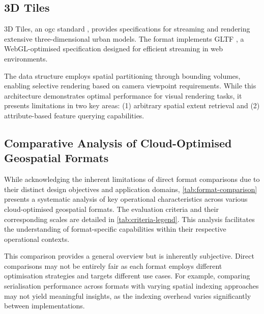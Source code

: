 \subsection{3D Tiles}
\label{rw:cloud_optimised_implementations:3d_tiles}
3D Tiles, an \ac{ogc} standard \citep{3d_tiles}, provides specifications for streaming and rendering extensive three-dimensional urban models. The format implements GLTF \citep{gltf}, a WebGL-optimised specification designed for efficient streaming in web environments.

The data structure employs spatial partitioning through bounding volumes, enabling selective rendering based on camera viewpoint requirements. While this architecture demonstrates optimal performance for visual rendering tasks, it presents limitations in two key areas: (1) arbitrary spatial extent retrieval and (2) attribute-based feature querying capabilities.

\subsection{Comparative Analysis of Cloud-Optimised Geospatial Formats}
\label{rw:cloud_optimised_implementations:comparison}
While acknowledging the inherent limitations of direct format comparisons due to their distinct design objectives and application domains, \autoref{tab:format-comparison} presents a systematic analysis of key operational characteristics across various cloud-optimised geospatial formats. The evaluation criteria and their corresponding scales are detailed in \autoref{tab:criteria-legend}. This analysis facilitates the understanding of format-specific capabilities within their respective operational contexts.

This comparison provides a general overview but is inherently subjective. Direct comparisons may not be entirely fair as each format employs different optimisation strategies and targets different use cases. For example, comparing serialisation performance across formats with varying spatial indexing approaches may not yield meaningful insights, as the indexing overhead varies significantly between implementations.

